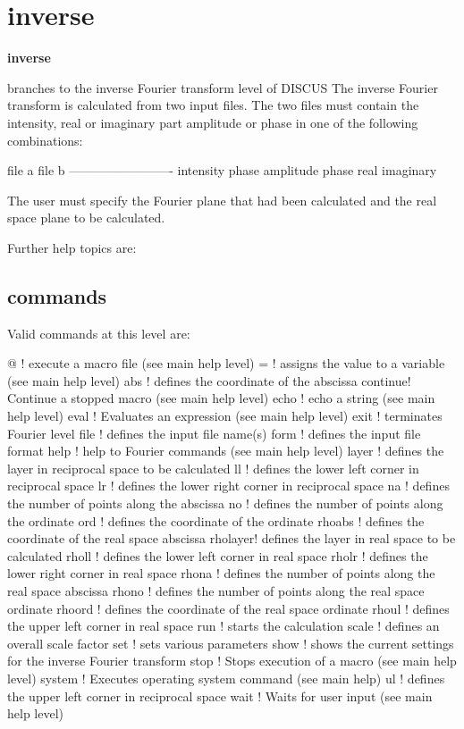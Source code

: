 \section{inverse}
{\bf inverse \par }
\par
\vspace{3pt}
branches to the inverse Fourier transform level of DISCUS 
The inverse Fourier transform is calculated from two input files. 
The two files must contain the intensity, real or imaginary part 
amplitude or phase in one of the following combinations: 
\par
\begin{MacVerbatim}
file a          file b
-------------------------
intensity       phase
amplitude       phase
real            imaginary
\end{MacVerbatim}
The user must specify the Fourier plane that had been calculated 
and the real space plane to be calculated. 
\par
Further help topics are: 
\par
\subsection*{commands}
Valid commands at this level are: 
\par
\begin{MacVerbatim}
@       ! execute a macro file (see main help level)
=       ! assigns the value to a variable (see main help level)
abs     ! defines the coordinate of the abscissa
continue! Continue a stopped macro (see main help level)
echo    ! echo a string (see main help level)
eval    ! Evaluates an expression (see main help level)
exit    ! terminates Fourier level
file    ! defines the input file name(s)
form    ! defines the input file format
help    ! help to Fourier commands (see main help level)
layer   ! defines the layer in reciprocal space to be calculated
ll      ! defines the lower left corner in reciprocal space
lr      ! defines the lower right corner in reciprocal space
na      ! defines the number of points along the abscissa
no      ! defines the number of points along the ordinate
ord     ! defines the coordinate of the ordinate
rhoabs  ! defines the coordinate of the real space abscissa
rholayer! defines the layer in real space to be calculated
rholl   ! defines the lower left corner in real space
rholr   ! defines the lower right corner in real space
rhona   ! defines the number of points along the real space abscissa
rhono   ! defines the number of points along the real space ordinate
rhoord  ! defines the coordinate of the real space ordinate
rhoul   ! defines the upper left corner in real space
run     ! starts the calculation
scale   ! defines an overall scale factor
set     ! sets various parameters
show    ! shows the current settings for the inverse Fourier transform
stop    ! Stops execution of a macro (see main help level)
system  ! Executes operating system command (see main help)
ul      ! defines the upper left corner in reciprocal space
wait    ! Waits for user input (see main help level)
\end{MacVerbatim}

